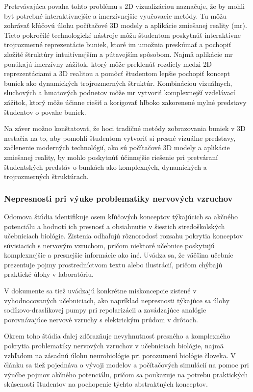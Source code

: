 Pretrvávajúca povaha tohto problému s 2D vizualizáciou naznačuje, že by mohli byť potrebné interaktívnejšie a imerzívnejšie vyučovacie metódy. Tu môžu zohrávať kľúčovú úlohu počítačové 
3D modely a aplikácie zmiešanej reality (\acrshort{mr}). Tieto pokročilé technologické nástroje môžu študentom poskytnúť interaktívne trojrozmerné reprezentácie buniek, ktoré im umožnia preskúmať a 
pochopiť zložité štruktúry intuitívnejším a pútavejším spôsobom. Najmä aplikácie \acrshort{mr} ponúkajú imerzívny zážitok, ktorý môže preklenúť rozdiely medzi 2D reprezentáciami a 3D realitou a pomôcť 
študentom lepšie pochopiť koncept buniek ako dynamických trojrozmerných štruktúr. Kombináciou vizuálnych, sluchových a hmatových podnetov môže \acrshort{mr} vytvoriť komplexnejší vzdelávací zážitok, 
ktorý môže účinne riešiť a korigovať hlboko zakorenené mylné predstavy študentov o povahe buniek.

Na záver možno konštatovať, že hoci tradičné metódy zobrazovania buniek v 3D nestačia na to, aby pomohli študentom vytvoriť si presné vizuálne predstavy, začlenenie moderných technológií, 
ako sú počítačové 3D modely a aplikácie zmiešanej reality, by mohlo poskytnúť účinnejšie riešenie pri pretváraní študentských predstáv o bunkách ako komplexných, dynamických a trojrozmerných štruktúrach.

\subsubsection{Nepresnosti pri výuke problematiky nervových vzruchov}
Odomova štúdia \cite{odomActionPotentialsBiology1993} identifikuje osem kľúčových konceptov týkajúcich sa akčného potenciálu a hodnotí ich presnosť a obsiahnutie v šiestich 
stredoškolských učebniciach biológie. Zistenia odhaľujú rôznorodosť rozsahu pokrytia konceptov súvisiacich s nervovým vzruchom, pričom niektoré učebnice poskytujú komplexnejšie 
a presnejšie informácie ako iné. Uvádza sa, že väčšina učebníc prezentuje pojmy prostredníctvom textu alebo ilustrácií, pričom chýbajú praktické úlohy v laboratóriu. 

V dokumente sa tiež uvádzajú konkrétne miskoncepcie zistené v vyhodnocovaných učebniciach, ako napríklad nepresnosti týkajúce sa úlohy sodíkovo-draslíkovej pumpy pri repolarizácii 
a zavádzajúce analógie porovnávajúce nervové vzruchy s elektrickým prúdom v drôtoch. 

Okrem toho štúdia ďalej zdôrazňuje nevyhnutnosť presného a komplexného pokrytia problematiky nervových vzruchov v učebniciach biológie, najmä vzhľadom na zásadnú úlohu neurobiológie 
pri porozumení biológie človeka. V článku sa tiež pojednáva o vývoji modelov a počítačových simulácií na pomoc pri výučbe pojmov akčného potenciálu, pričom sa poukazuje na potrebu 
praktických skúseností študentov na pochopenie týchto abstraktných konceptov. 

